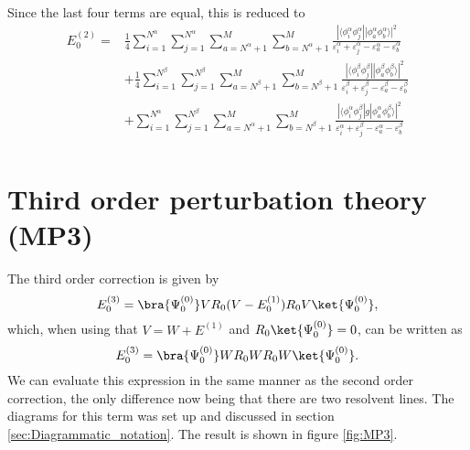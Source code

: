 Since the last four terms are equal, this is reduced to
\begin{equation}
\label{eq:UMP2}
 \begin{split}
  E^{(2)}_0 = & \frac{1}{4}\sum_{i=1}^{N^\alpha}\sum_{j=1}^{N^\alpha}\sum_{a=N^\alpha+1}^M\sum_{b=N^\alpha+1}^M\frac{|\langle\phi_i^\alpha \phi_j^\alpha||\phi_a^\alpha \phi_b^\alpha\rangle|^2}{\varepsilon^\alpha_i + \varepsilon^\alpha_j - \varepsilon^\alpha_a - \varepsilon^\alpha_b}  \\
              & +\frac{1}{4}\sum_{i=1}^{N^\beta}\sum_{j=1}^{N^\beta}\sum_{a=N^\beta+1}^M\sum_{b=N^\beta+1}^M\frac{|\langle\phi_i^\beta \phi_j^\beta||\phi_a^\beta \phi_b^\beta\rangle|^2}{\varepsilon^\beta_i + \varepsilon^\beta_j - \varepsilon^\beta_a - \varepsilon^\beta_b}  \\
              & +\sum_{i=1}^{N^\alpha}\sum_{j=1}^{N^\beta}\sum_{a=N^\alpha+1}^M\sum_{b=N^\beta+1}^M\frac{|\langle\phi_i^\alpha \phi_j^\beta|g|\phi_a^\alpha \phi_b^\beta\rangle|^2}{\varepsilon^\alpha_i + \varepsilon^\beta_j - \varepsilon^\alpha_a - \varepsilon^\beta_b}  \\
 \end{split}
\end{equation} 






\section{Third order perturbation theory (MP3)}
The third order correction is given by
\begin{equation}
 E^{(3)}_0 = \bra{\Psi^{(0)}_0}V R_0(V - E^{(1)}_0)R_0 V\ket{\Psi^{(0)}_0},
\end{equation}
 which, when using that $V = W + E^{(1)}$ and $R_0\ket{\Psi^{(0)}_0} = 0$, can be written as
\begin{equation}
 E^{(3)}_0 = \bra{\Psi^{(0)}_0}W R_0 W R_0 W\ket{\Psi^{(0)}_0}.
\end{equation}
We can evaluate this expression in the same manner as the second order correction, the only difference now being that there are two resolvent lines.
The diagrams for this term was set up and discussed in section \ref{sec:Diagrammatic_notation}.
The result is shown in figure \ref{fig:MP3}.

